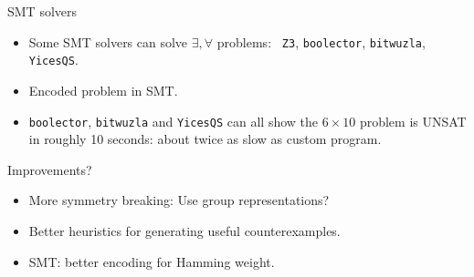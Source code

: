 \begin{frame}{SMT solvers}
  \begin{itemize}
  \item Some SMT solvers can solve $\exists, \forall$ problems: {\tt
      Z3}, {\tt boolector}, {\tt bitwuzla}, {\tt YicesQS}.
  \item Encoded problem in SMT.
  \item {\tt boolector}, {\tt bitwuzla} and {\tt YicesQS} can all show
    the $6 \times 10$ problem is UNSAT in roughly 10 seconds: about
    twice as slow as custom program.
  \end{itemize}
\end{frame}
\begin{frame}{Improvements?}
  \begin{itemize}
  \item More symmetry breaking: Use group representations?
  \item Better heuristics for generating useful counterexamples.
  \item SMT: better encoding for Hamming weight.
  \end{itemize}
\end{frame}
